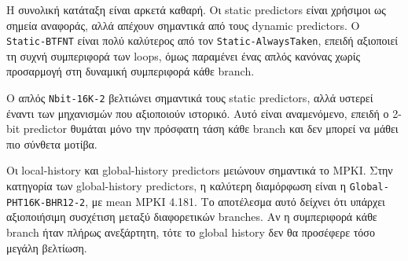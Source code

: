 \documentclass{article}
\begin{document}
\begin{center}
\label{tab:predictor_comparison}
\end{center}

Η συνολική κατάταξη είναι αρκετά καθαρή. Οι static predictors είναι χρήσιμοι ως σημεία αναφοράς, αλλά απέχουν σημαντικά από τους dynamic predictors. Ο \texttt{Static-BTFNT} είναι πολύ καλύτερος από τον \texttt{Static-AlwaysTaken}, επειδή αξιοποιεί τη συχνή συμπεριφορά των loops, όμως παραμένει ένας απλός κανόνας χωρίς προσαρμογή στη δυναμική συμπεριφορά κάθε branch.

Ο απλός \texttt{Nbit-16K-2} βελτιώνει σημαντικά τους static predictors, αλλά υστερεί έναντι των μηχανισμών που αξιοποιούν ιστορικό. Αυτό είναι αναμενόμενο, επειδή ο 2-bit predictor θυμάται μόνο την πρόσφατη τάση κάθε branch και δεν μπορεί να μάθει πιο σύνθετα μοτίβα.

Οι local-history και global-history predictors μειώνουν σημαντικά το MPKI. Στην κατηγορία των global-history predictors, η καλύτερη διαμόρφωση είναι η \texttt{Global-PHT16K-BHR12-2}, με mean MPKI 4.181. Το αποτέλεσμα αυτό δείχνει ότι υπάρχει αξιοποιήσιμη συσχέτιση μεταξύ διαφορετικών branches. Αν η συμπεριφορά κάθε branch ήταν πλήρως ανεξάρτητη, τότε το global history δεν θα προσέφερε τόσο μεγάλη βελτίωση.
\end{document}
